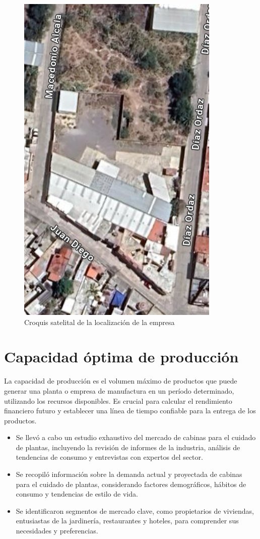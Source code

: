 \begin{figure}[H]
    \centering	
    \includegraphics[width=.7\textwidth]{img/Empresa/ubicacion2.png} 
    \caption{Croquis satelital de la localización de la empresa}
\label{fig:croquis1}
\end{figure}

\newpage

\section{Capacidad óptima de producción}

La capacidad de producción es el volumen máximo de productos que puede generar una planta o empresa de manufactura en un período determinado, utilizando los recursos disponibles. Es crucial para calcular el rendimiento financiero futuro y establecer una línea de tiempo confiable para la entrega de los productos.

   \begin{itemize}
       \item Se llevó a cabo un estudio exhaustivo del mercado de cabinas para el cuidado de plantas, incluyendo la revisión de informes de la industria, análisis de tendencias de consumo y entrevistas con expertos del sector.
       \item Se recopiló información sobre la demanda actual y proyectada de cabinas para el cuidado de plantas, considerando factores demográficos, hábitos de consumo y tendencias de estilo de vida.
       \item Se identificaron segmentos de mercado clave, como propietarios de viviendas, entusiastas de la jardinería, restaurantes y hoteles, para comprender sus necesidades y preferencias.
   \end{itemize}

